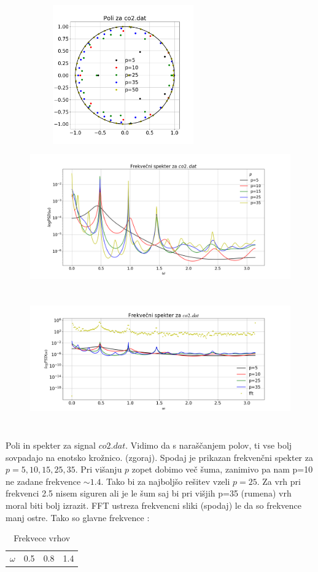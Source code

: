 \documentclass[11pt, a4paper]{article}
\begin{document}
\begin{figure}[H]
\centering
  \includegraphics[width=8cm,height=6cm]{prva_drugi3.png}
  \includegraphics[width=18cm,height=6cm]{druga_frekvencni.png}
  \includegraphics[width=18cm,height=6cm]{prva_drugi4b.png}
  
\end{figure} 
Poli in spekter za signal $co2.dat$. Vidimo da s naraščanjem polov, ti vse bolj sovpadajo na enotsko krožnico. (zgoraj). \newline
Spodaj je prikazan frekvenčni spekter za $p = 5,10,15,25,35$. Pri višanju $p$ zopet dobimo več šuma, zanimivo pa nam p=10 ne zadane frekvence $\sim 1.4 $. Tako bi za najboljšo rešitev vzeli $p=25$. Za vrh pri frekvenci 2.5 nisem siguren ali je le šum saj bi pri višjih p=35 (rumena) vrh moral biti bolj izrazit. FFT ustreza frekvencni sliki (spodaj) le da so frekvence manj ostre. Tako so glavne frekvence :
\begin{table}[H]
\centering
\caption{Frekvece vrhov}
\label{my-label}
\begin{tabular}{llll}
$\omega$ & 0.5 & 0.8 & 1.4
\end{tabular}
\end{table}
\end{document}
